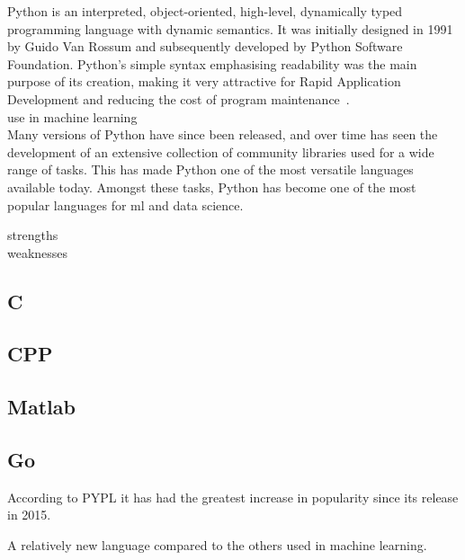 Python is an interpreted, object-oriented, high-level, dynamically typed programming language with dynamic semantics. It was initially designed in 1991 by Guido Van Rossum and subsequently
developed by Python Software Foundation. Python's simple syntax emphasising readability was the main purpose of its creation, making it very attractive for Rapid Application Development and reducing
the cost of program maintenance~\citep{whatispython}.\\

use in machine learning\\

Many versions of Python have since been released, and over time has seen the development of an extensive collection of community libraries used for a wide range of tasks. This
has made Python one of the most versatile languages available today. Amongst these tasks, Python has become one of the most popular languages for \gls{ml} and data science.


strengths\\

weaknesses\\


\subsection{C}

\subsection{CPP}

\subsection{Matlab}

\subsection{Go}
According to PYPL it has had the greatest increase in popularity since its release in 2015.

A relatively new language compared to the others used in machine learning.

